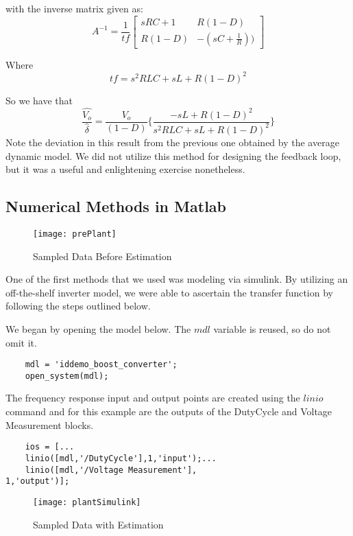 with the inverse matrix given as:
\begin{equation}
A^{-1} = \frac{1}{tf}\begin{bmatrix}
sRC + 1 & R(1-D) \\ 
R(1-D) & -(sC+\frac{1}{R})) 
\end{bmatrix}
\end{equation}

Where
\begin{equation}
tf = s^2RLC + sL + R(1-D)^2
\end{equation}

So we have that 
\begin{equation}
\frac{\hat{V_o}}{\hat{\delta}} = \frac{V_o}{(1-D)} \bigg\{\frac{-sL + R(1-D)^2}{s^2RLC + sL + R(1-D)^2}\bigg\}
\end{equation}
Note the deviation in this result from the previous one obtained by the average dynamic model. We did not utilize this method for designing the feedback loop, but it was a useful and enlightening exercise nonetheless.

\subsection{Numerical Methods in Matlab}

\begin{figure}[htbp]
\begin{center}
\texttt{[image: prePlant]}
\caption{Sampled Data Before Estimation}
\label{prePlant}
\end{center}
\end{figure}
One of the first methods that we used was modeling via simulink. By utilizing an off-the-shelf inverter model, we were able to ascertain the transfer function by following the steps outlined below. 

We began by opening the model below. The $mdl$ variable is reused, so do not omit it.
\begin{verbatim}
	mdl = 'iddemo_boost_converter';
	open_system(mdl);
\end{verbatim}
The frequency response input and output points are created using the $linio$ command and for this example are the outputs of the DutyCycle and Voltage Measurement blocks.
\begin{verbatim}
	ios = [...
	linio([mdl,'/DutyCycle'],1,'input');...
	linio([mdl,'/Voltage Measurement'],
1,'output')];
\end{verbatim}

\begin{figure}[htbp]
\begin{center}
\texttt{[image: plantSimulink]}
\caption{Sampled Data with Estimation}
\label{plantSimulink}
\end{center}
\end{figure}

